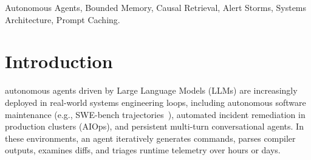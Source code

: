 \documentclass[10pt,journal,compsoc]{IEEEtran}
\begin{document}
{\begin{IEEEkeywords}
Autonomous Agents, Bounded Memory, Causal Retrieval, Alert Storms, Systems Architecture, Prompt Caching.
\end{IEEEkeywords}}

\maketitle

\section{Introduction}
 autonomous agents driven by Large Language Models (LLMs) are increasingly deployed in real-world systems engineering loops, including autonomous software maintenance (e.g., SWE-bench trajectories~\cite{jimenez2023swebench}), automated incident remediation in production clusters (AIOps), and persistent multi-turn conversational agents. In these environments, an agent iteratively generates commands, parses compiler outputs, examines diffs, and triages runtime telemetry over hours or days.
\end{document}
